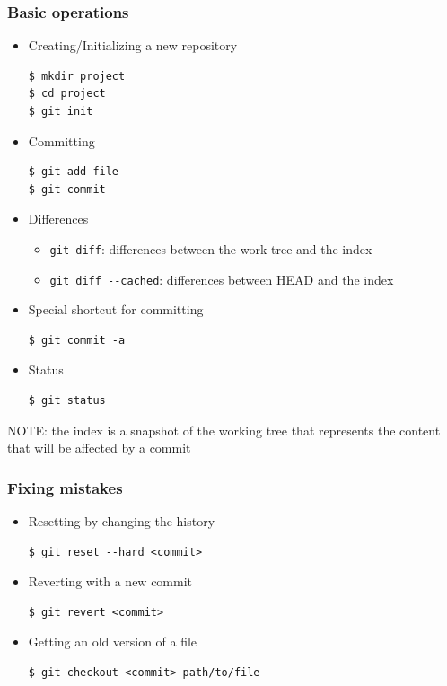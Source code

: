 \begin{frame}[fragile]
  \frametitle{Basic operations}
  \begin{itemize}
  \item Creating/Initializing a new repository
    {\scriptsize
\begin{verbatim}
$ mkdir project
$ cd project
$ git init
\end{verbatim}
    }

  \item Committing
    {\scriptsize
\begin{verbatim}
$ git add file
$ git commit 
\end{verbatim}
    }

  \item Differences
    \begin{itemize}
    \item {\scriptsize \verb|git diff|}: differences between the work tree and the index
    \item {\scriptsize \verb|git diff --cached|}: differences between HEAD and the index
    \end{itemize}

  \item Special shortcut for committing
    {\scriptsize
\begin{verbatim}
$ git commit -a
\end{verbatim}
    }

  \item Status
    {\scriptsize
\begin{verbatim}
$ git status
\end{verbatim}
    }
  \end{itemize}

NOTE: the index is a snapshot of the working tree that represents the
content that will be affected by a commit
\end{frame}

\begin{frame}[fragile]
  \frametitle{Fixing mistakes}

  \begin{itemize}
  \item Resetting by changing the history
    {\scriptsize
\begin{verbatim}
$ git reset --hard <commit>
\end{verbatim}
      }

    \item Reverting with a new commit
      {\scriptsize
\begin{verbatim}
$ git revert <commit>
\end{verbatim}
      }

    \item Getting an old version of a file
      {\scriptsize
\begin{verbatim}
$ git checkout <commit> path/to/file
\end{verbatim}
      }
      \end{itemize}

\end{frame}

